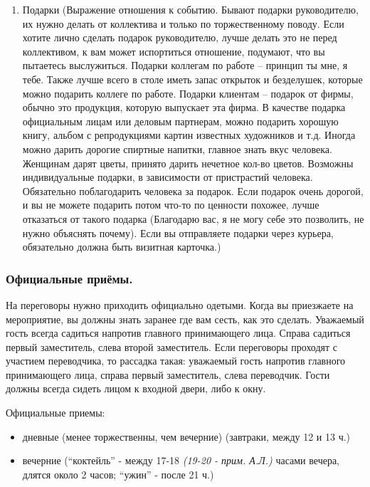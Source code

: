 \begin{enumerate}
\item Подарки (Выражение отношения к событию. Бывают подарки руководителю, их нужно делать от коллектива и только по торжественному поводу. Если хотите лично сделать подарок руководителю, лучше делать это не перед коллективом, к вам может испортиться отношение, подумают, что вы пытаетесь выслужиться. Подарки коллегам по работе – принцип ты мне, я тебе. Также лучше всего в столе иметь запас открыток и безделушек, которые можно подарить коллеге по работе. Подарки клиентам – подарок от фирмы, обычно это продукция, которую выпускает эта фирма. В качестве подарка официальным лицам или деловым партнерам, можно подарить хорошую книгу, альбом с репродукциями картин известных художников и т.д. Иногда можно дарить дорогие спиртные напитки, главное знать вкус человека. Женщинам дарят цветы, принято дарить нечетное кол-во цветов. Возможны индивидуальные подарки, в зависимости от пристрастий человека. Обязательно поблагодарить человека за подарок. Если подарок очень дорогой, и вы не можете подарить потом что-то по ценности похожее, лучше отказаться от такого подарка (Благодарю вас, я не могу себе это позволить, не нужно объяснять почему). Если вы отправляете подарки через курьера, обязательно должна быть визитная карточка.)
\end{enumerate}

\subsubsection{Официальные приёмы.}

На переговоры нужно приходить официально одетыми.
Когда вы приезжаете на мероприятие, вы должны знать заранее где вам сесть, как это сделать. Уважаемый гость всегда садиться напротив главного принимающего лица. Справа садиться первый заместитель, слева второй заместитель. Если переговоры проходят с участием переводчика, то рассадка такая: уважаемый гость напротив главного принимающего лица, справа первый заместитель, слева переводчик. Гости должны всегда сидеть лицом к входной двери, либо к окну.

Официальные приемы:
\begin{itemize}
\item дневные (менее торжественны, чем вечерние) (завтраки, между 12 и 13 ч.)
\item вечерние (``коктейль'' - между 17-18 \textit{(19-20 - прим. А.Л.)} часами вечера, длятся около 2 часов; ``ужин'' - после 21 ч.)
\end{itemize}

